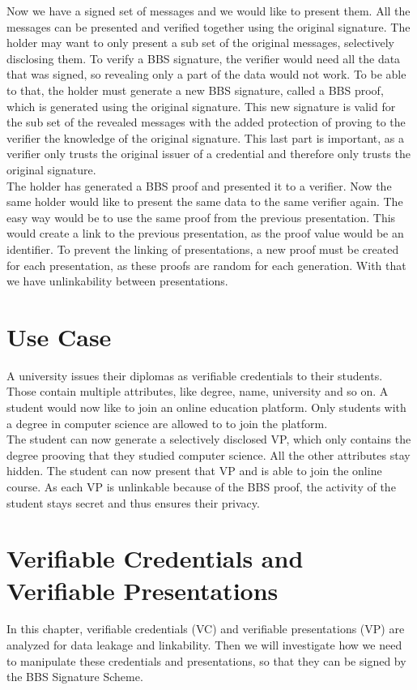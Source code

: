 \documentclass[
	a4paper               %
	,BCOR=0mm            %
	,bibliography=totoc   %
	,listof=totoc         %
	,monolingual
	,twoside=false
]{bfhthesis}              %
\begin{document}
Now we have a signed set of messages and we would like to present them. All the messages can be presented and verified together using the original signature. The holder may want to only present a sub set of the original messages, selectively disclosing them. To verify a BBS signature, the verifier would need all the data that was signed, so revealing only a part of the data would not work. To be able to that, the holder must generate a new BBS signature, called a BBS proof, which is generated using the original signature. This new signature is valid for the sub set of the revealed messages with the added protection of proving to the verifier the knowledge of the original signature. This last part is important, as a verifier only trusts the original issuer of a credential and therefore only trusts the original signature.\\

The holder has generated a BBS proof and presented it to a verifier. Now the same holder would like to present the same data to the same verifier again. The easy way would be to use the same proof from the previous presentation. This would create a link to the previous presentation, as the proof value would be an identifier. To prevent the linking of presentations, a new proof must be created for each presentation, as these proofs are random for each generation. With that we have unlinkability between presentations.


\chapter{Use Case}
\label{chap:usecase}
A university issues their diplomas as verifiable credentials to their students. Those contain multiple attributes, like degree, name, university and so on. A student would now like to join an online education platform. Only students with a degree in computer science are allowed to to join the platform.\\

The student can now generate a selectively disclosed VP, which only contains the degree prooving that they studied computer science. All the other attributes stay hidden. The student can now present that VP and is able to join the online course. As each VP is unlinkable because of the BBS proof, the activity of the student stays secret and thus ensures their privacy.


\chapter{Verifiable Credentials and Verifiable Presentations}
\label{chap:vpnvc}
In this chapter, verifiable credentials (VC) and verifiable presentations (VP) are analyzed for data leakage and linkability.
Then we will investigate how we need to manipulate these credentials and presentations, so that they can be signed by the BBS Signature Scheme.
\end{document}
